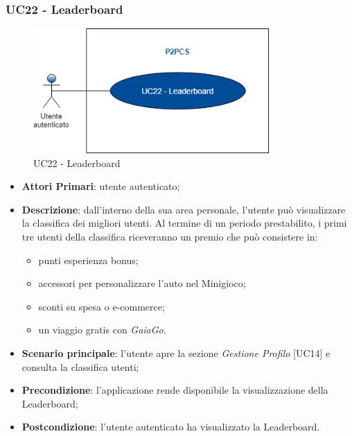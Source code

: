 \subsubsection{UC22 - Leaderboard}
\begin{figure}[h]
	\includegraphics[width=9cm]{res/images/UC22Leaderboard.png}
	\centering
	\caption{UC22 - Leaderboard}
\end{figure}
\begin{itemize}
	\item \textbf{Attori Primari}: utente autenticato;
	\item \textbf{Descrizione}: dall'interno della sua area personale, l'utente può visualizzare la classifica dei migliori utenti. Al termine di un periodo prestabilito, i primi tre utenti della classifica riceveranno un premio che può consistere in:
	\begin{itemize}
		\item punti esperienza bonus;
		\item accessori per personalizzare l'auto nel Minigioco;
		\item sconti su spesa o e-commerce;
		\item un viaggio gratis con \textit{GaiaGo}.
	\end{itemize}
	\item \textbf{Scenario principale}: l'utente apre la sezione \textit{Gestione Profilo} [UC14] e consulta la classifica utenti;
	\item \textbf{Precondizione}: l'applicazione rende disponibile la visualizzazione della Leaderboard\glo;
	\item \textbf{Postcondizione}: l'utente autenticato ha visualizzato la Leaderboard.
\end{itemize}

